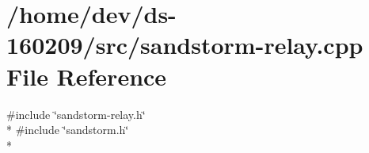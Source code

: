 \hypertarget{sandstorm-relay_8cpp}{}\section{/home/dev/ds-\/160209/src/sandstorm-\/relay.cpp File Reference}
\label{sandstorm-relay_8cpp}
{\ttfamily \#include \char`\"{}sandstorm-\/relay.\+h\char`\"{}}\\*
{\ttfamily \#include \char`\"{}sandstorm.\+h\char`\"{}}\\*
